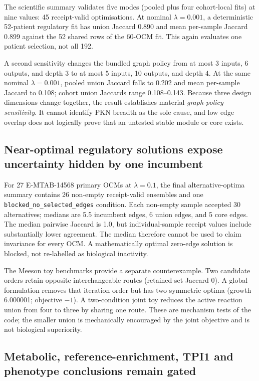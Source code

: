 \documentclass[10pt]{article}
\begin{document}
The scientific summary validates five modes (pooled plus four cohort-local
fits) at nine values: 45 receipt-valid optimisations.  At nominal
$\lambda=0.001$, a deterministic 52-patient regulatory fit has union Jaccard
0.890 and mean per-sample Jaccard 0.899 against the 52 shared rows of the
60-OCM fit.  This again evaluates one patient selection, not all 192.

A second sensitivity changes the bundled graph policy from at most 3 inputs,
6 outputs, and depth 3 to at most 5 inputs, 10 outputs, and depth 4.  At the
same nominal $\lambda=0.001$, pooled union Jaccard falls to 0.202 and mean
per-sample Jaccard to 0.108; cohort union Jaccards range 0.108--0.143.  Because
three design dimensions change together, the result establishes material
\emph{graph-policy sensitivity}.  It cannot identify PKN breadth as the sole
cause, and low edge overlap does not logically prove that an untested stable
module or core exists.

\subsection{Near-optimal regulatory solutions expose uncertainty hidden by one incumbent}

For 27 E-MTAB-14568 primary OCMs at $\lambda=0.1$, the final alternative-optima
summary contains 26 non-empty receipt-valid ensembles and one
\texttt{blocked\_no\_selected\_edges} condition.  Each non-empty sample accepted
30 alternatives; medians are 5.5 incumbent edges, 6 union edges, and 5 core
edges.  The median pairwise Jaccard is 1.0, but individual-sample receipt values
include substantially lower agreement.  The median therefore cannot be used to
claim invariance for every OCM.  A mathematically optimal zero-edge solution is
blocked, not re-labelled as biological inactivity.

The Meeson toy benchmarks provide a separate counterexample.  Two candidate
orders retain opposite interchangeable routes (retained-set Jaccard 0).  A
global formulation removes that iteration order but has two symmetric optima
(growth 6.000001; objective $-1$).  A two-condition joint toy reduces the active
reaction union from four to three by sharing one route.  These are mechanism
tests of the code; the smaller union is mechanically encouraged by the joint
objective and is not biological superiority.

\subsection{Metabolic, reference-enrichment, TPI1 and phenotype conclusions remain gated}
\end{document}
